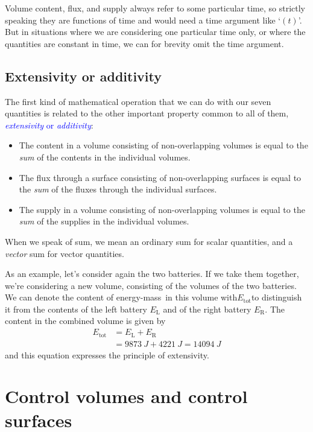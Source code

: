 \documentclass[a4paper,12pt,%
onecolumn,oneside,%
british%
]{memoir}
\renewcommand*{\|}[1][]{\nonscript\:#1\vert\nonscript\:\mathopen{}}
\newcommand*{\sect}{\S}%
\renewcommand*{\autoref}[2]{\sidepar{\vspace{-1ex}\footnotesize{\color{blue}\faIcon{%
angle-right%
}\enskip\sect~\ref{#1} page~\pageref{#1}}}\textcolor{blue}{#2}}
\newcommand*{\energym}{energy-mass}
\newcommand*{\yE}{E}
\begin{document}
Volume content, flux, and supply always refer to some particular time, so strictly speaking they are functions of time and would need a time argument like \enquote*{$(t)$}. But in situations where we are considering one particular time only, or where the quantities are constant in time, we can for brevity omit the time argument.


\subsection{Extensivity or additivity}
\label{sec:extens_sum}

The first kind of mathematical operation that we can do with our seven quantities is related to the other important property common to all of them, \autoref{def:extensivity}{\emph{extensivity} or \emph{additivity}}:
\begin{itemize}
\item The content in a volume consisting of non-overlapping volumes is equal to the \emph{sum} of the contents in the individual volumes.
\item The flux through a surface consisting of non-overlapping surfaces is equal to the \emph{sum} of the fluxes through the individual surfaces.
\item The supply in a volume consisting of non-overlapping volumes is equal to the \emph{sum} of the supplies in the individual volumes.
\end{itemize}
When we speak of sum, we mean an ordinary sum for scalar quantities, and a \emph{vector} sum for vector quantities.

As an example, let's consider again the two batteries. If we take them together, we're considering a new volume, consisting of the volumes of the two batteries. We can denote the content of \energym\ in this volume with\enskip$\yE_{\text{tot}}$\enskip to distinguish it from the contents of the left battery $\yE_{\text{L}}$ and of the right battery $\yE_{\text{R}}$. The content in the combined volume is given by
\begin{equation*}
  \begin{split}
    \yE_{\text{tot}} &= \yE_{\text{L}} + \yE_{\text{R}}
    \\ &= \qty{9873}{J} + \qty{4221}{J}
    = \qty{14094}{J}
  \end{split}
\end{equation*}
and this equation expresses the principle of extensivity.

\section{Control volumes and control surfaces}
\label{sec_controlvolumes_surfaces}
\end{document}
